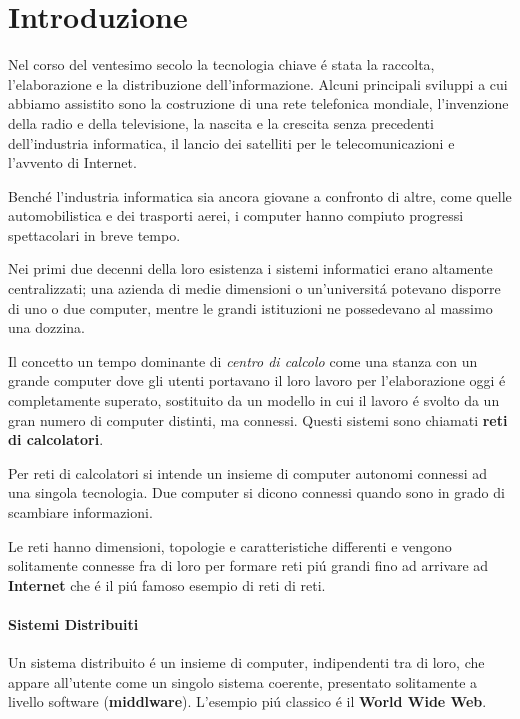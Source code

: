 \documentclass[12pt]{article}
\begin{document}
\date{}
\title{\vspace{-11ex}} %
 
\maketitle
 
\section{Introduzione}\label{intro}
Nel corso del ventesimo secolo la tecnologia chiave \'e stata la raccolta, l'elaborazione e la distribuzione 
dell'informazione. Alcuni principali sviluppi a cui abbiamo assistito sono la costruzione di una rete telefonica mondiale, 
l'invenzione della radio e della televisione, la nascita e la crescita senza precedenti dell'industria informatica, il 
lancio dei satelliti per le telecomunicazioni e l'avvento di Internet.

Bench\'e  l'industria informatica sia ancora giovane a confronto di altre, come quelle automobilistica e dei trasporti
aerei, i computer hanno compiuto progressi spettacolari in breve tempo.

Nei primi due decenni della loro esistenza i sistemi informatici erano altamente centralizzati; una azienda di medie
dimensioni o un'universit\'a potevano disporre di uno o due computer, mentre le grandi istituzioni ne possedevano al 
massimo una dozzina.

Il concetto un tempo dominante di \textit{centro di calcolo} come una stanza con un grande computer dove gli utenti 
portavano il loro lavoro per l'elaborazione oggi \'e completamente superato, sostituito da un modello in cui il lavoro \'e 
svolto da un gran numero di computer distinti, ma connessi. Questi sistemi sono chiamati \textbf{reti di calcolatori}.

Per reti di calcolatori si intende un insieme di computer autonomi connessi ad una singola tecnologia. Due computer si
dicono connessi quando sono in grado di scambiare informazioni.

Le reti hanno dimensioni, topologie e caratteristiche differenti e vengono solitamente connesse fra di loro per formare
reti pi\'u grandi fino ad arrivare ad \textbf{Internet} che \'e il pi\'u famoso esempio di reti di reti.

\paragraph{Sistemi Distribuiti} Un sistema distribuito \'e un insieme di computer, indipendenti tra di loro, che appare
all'utente come un singolo sistema coerente, presentato solitamente a livello software (\textbf{middlware}). L'esempio 
pi\'u classico \'e il \textbf{World Wide Web}.
\end{document}

